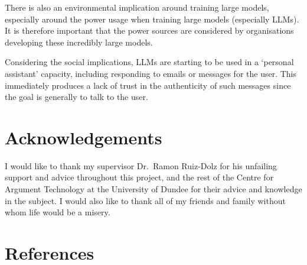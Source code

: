 \documentclass[twocolumn,twoside]{article}
\begin{document}
There is also an environmental implication around training large models,
especially around the power usage when training large models (especially
LLMs). It is therefore important that the power sources are considered
by organisations developing these incredibly large models.

Considering the social implications, LLMs are starting to be used in a
`personal assistant' capacity, including responding to emails or
messages for the user. This immediately produces a lack of trust in the
authenticity of such messages since the goal is generally to talk to the
user.

\section*{Acknowledgements}\label{acknowledgements}

I would like to thank my supervisor Dr.~Ramon Ruiz-Dolz for his
unfailing support and advice throughout this project, and the rest of
the Centre for Argument Technology at the University of Dundee for their
advice and knowledge in the subject. I would also like to thank all of
my friends and family without whom life would be a misery.

\section*{References}\label{references}
\end{document}
